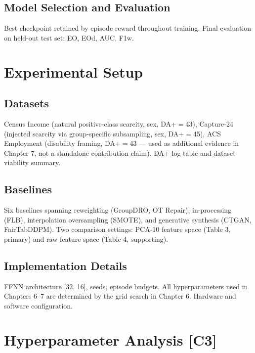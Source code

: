 \documentclass[12pt]{article}
\newcommand{\contrib}[1]{\textbf{[#1]}}
\begin{document}
\subsection{Model Selection and Evaluation}
Best checkpoint retained by episode reward throughout training. Final
evaluation on held-out test set: EO, EOd, AUC, F1w.

\section{Experimental Setup}

\subsection{Datasets}
Census Income (natural positive-class scarcity, sex, DA+$=$43), Capture-24
(injected scarcity via group-specific subsampling, sex, DA+$=$45), ACS
Employment (disability framing, DA+$=$43 --- used as additional evidence in
Chapter 7, not a standalone contribution claim). DA+ log table and dataset
viability summary.

\subsection{Baselines}
Six baselines spanning reweighting (GroupDRO, OT Repair), in-processing (FLB),
interpolation oversampling (SMOTE), and generative synthesis (CTGAN,
FairTabDDPM). Two comparison settings: PCA-10 feature space (Table 3, primary)
and raw feature space (Table 4, supporting).

\subsection{Implementation Details}
FFNN architecture [32, 16], seeds, episode budgets. All hyperparameters used
in Chapters 6--7 are determined by the grid search in Chapter 6. Hardware and
software configuration.

\section{Hyperparameter Analysis \contrib{C3}}
\end{document}
